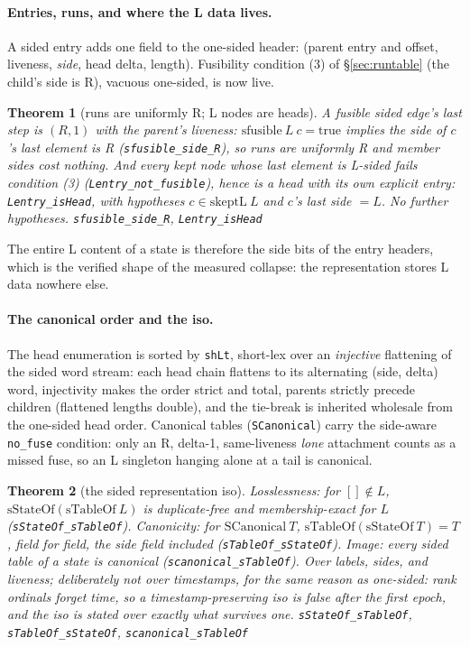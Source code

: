\documentclass[11pt]{article}
\newtheorem{theorem}{Theorem}[section]
\newcommand{\lean}[1]{\texttt{#1}}
\begin{document}
\paragraph{Entries, runs, and where the L data lives.} A sided entry
adds one field to the one-sided header: (parent entry and offset,
liveness, \emph{side}, head delta, length). Fusibility condition (3) of
\S\ref{sec:runtable} (the child's side is R), vacuous one-sided, is now
live.

\begin{theorem}[runs are uniformly R; L nodes are heads]
\label{thm:sidedL}
A fusible sided edge's last step is $(R, 1)$ with the parent's
liveness: $\mathrm{sfusible}\ L\ c = \mathrm{true}$ implies the side
of $c$'s last element is R (\lean{sfusible\_side\_R}), so runs are
uniformly R and member sides cost nothing. And every kept node whose
last element is L-sided fails condition (3)
(\lean{Lentry\_not\_fusible}), hence is a head with its own explicit
entry: \lean{Lentry\_isHead}, with hypotheses $c \in \mathrm{skeptL}\
L$ and $c$'s last side $= L$. No further hypotheses.
\hfill\lean{sfusible\_side\_R}, \lean{Lentry\_isHead}
\end{theorem}

\noindent The entire L content of a state is therefore the side bits
of the entry headers, which is the verified shape of the measured
collapse: the representation stores L data nowhere else.

\paragraph{The canonical order and the iso.} The head enumeration is
sorted by \lean{shLt}, short-lex over an \emph{injective} flattening of
the sided word stream: each head chain flattens to its alternating
(side, delta) word, injectivity makes the order strict and total,
parents strictly precede children (flattened lengths double), and the
tie-break is inherited wholesale from the one-sided head order.
Canonical tables (\lean{SCanonical}) carry the side-aware
\lean{no\_fuse} condition: only an R, delta-1, same-liveness
\emph{lone} attachment counts as a missed fuse, so an L singleton
hanging alone at a tail is canonical.

\begin{theorem}[the sided representation iso]
\label{thm:sidediso}
Losslessness: for $[] \notin L$, $\mathrm{sStateOf}(\mathrm{sTableOf}\
L)$ is duplicate-free and membership-exact for $L$
(\lean{sStateOf\_sTableOf}). Canonicity: for $\mathrm{SCanonical}\ T$,
$\mathrm{sTableOf}(\mathrm{sStateOf}\ T) = T$, field for field, the
side field included (\lean{sTableOf\_sStateOf}). Image: every sided
table of a state is canonical (\lean{scanonical\_sTableOf}). Over
labels, sides, and liveness; deliberately \emph{not} over timestamps,
for the same reason as one-sided: rank ordinals forget time, so a
timestamp-preserving iso is false after the first epoch, and the iso
is stated over exactly what survives one.
\hfill\lean{sStateOf\_sTableOf}, \lean{sTableOf\_sStateOf},
\lean{scanonical\_sTableOf}
\end{theorem}
\end{document}
